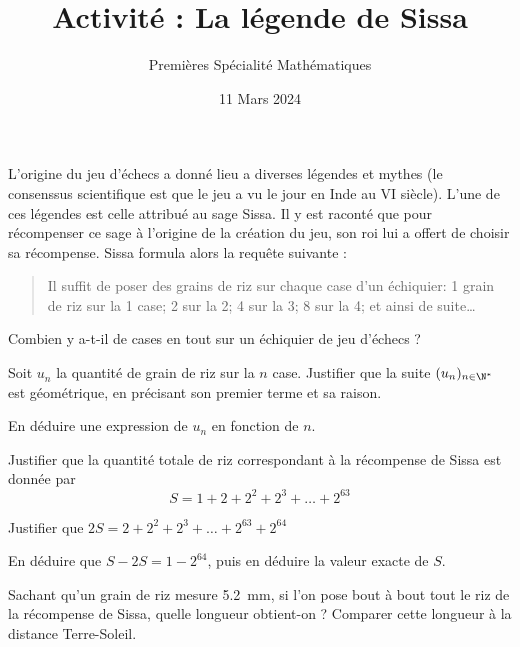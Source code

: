 \documentclass{article}
\title{Activité : La légende de Sissa}
\author{Premières Spécialité Mathématiques}
\date{11 Mars 2024}
\begin{document}
\maketitle

\begin{tcolorbox}
L'origine du jeu d'échecs a donné lieu a diverses légendes et mythes (le consenssus scientifique est que le jeu a vu le jour en Inde au VI\ieme{} siècle). L'une de ces légendes est celle attribué au sage Sissa. Il y est raconté que pour récompenser ce sage à l'origine de la création du jeu, son roi lui a offert de choisir sa récompense. Sissa formula alors la requête suivante :
\begin{quote}
Il suffit de poser des grains de riz sur chaque case d'un échiquier: 1 grain de riz sur la 1\iere{} case; 2 sur la 2\ieme{}; 4 sur la 3\ieme{}; 8 sur la 4\ieme{}; et ainsi de suite\dots
\end{quote}
\end{tcolorbox}
\begin{enumquestions}
\item Combien y a-t-il de cases en tout sur un échiquier de jeu d'échecs ?
\item Soit $u_n$ la quantité de grain de riz sur la $n$\ieme{} case. Justifier que la suite $(u_n)_{n \in \N^*}$ est géométrique, en précisant son premier terme et sa raison.
\item En déduire une expression de $u_n$ en fonction de $n$.
\item Justifier que la quantité totale de riz correspondant à la récompense de Sissa est donnée par
\begin{equation*}
S = 1 + 2 + 2^2 + 2^3 + \dots + 2^{63}
\end{equation*}
\item Justifier que $2S = 2 + 2^2 + 2^3 + \dots + 2^{63} + 2^{64}$
\item En déduire que $S - 2S = 1 - 2^{64}$, puis en déduire la valeur exacte de $S$.
\item Sachant qu'un grain de riz mesure \qty{5,2}{\milli\meter}, si l'on pose bout à bout tout le riz de la récompense de Sissa, quelle longueur obtient-on ? Comparer cette longueur à la distance Terre-Soleil.
\end{enumquestions}
\end{document}
